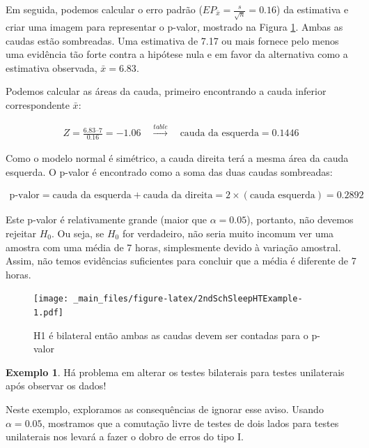 \documentclass[
]{book}
\theoremstyle{definition}
\theoremstyle{definition}
\newtheorem{example}{Exemplo}[chapter]
\theoremstyle{definition}
\theoremstyle{definition}
\theoremstyle{remark}
\begin{document}
Em seguida, podemos calcular o erro padrão (\(EP_{\bar{x}} = \frac{s}{\sqrt{n}} = 0.16\)) da estimativa e criar uma imagem para representar o p-valor, mostrado na Figura \ref{fig:2ndSchSleepHTExample}. Ambas as caudas estão sombreadas. Uma estimativa de 7.17 ou mais fornece pelo menos uma evidência tão forte contra a hipótese nula e em favor da alternativa como a estimativa observada, \(\bar{x} = 6.83\).

Podemos calcular as áreas da cauda, primeiro encontrando a cauda inferior correspondente \(\bar{x}\):

\begin{eqnarray*}
Z = \frac{6.83 – 7}{0.16} = -1.06 \quad\stackrel{table}{\rightarrow}\quad \text{cauda da esquerda} = 0.1446
\end{eqnarray*}

Como o modelo normal é simétrico, a cauda direita terá a mesma área da cauda esquerda. O p-valor é encontrado como a soma das duas caudas sombreadas:

\begin{eqnarray*}
\text{p-valor} = \text{cauda da esquerda} + \text{cauda da direita} = 2\times(\text{cauda esquerda}) = 0.2892
\end{eqnarray*}

Este p-valor é relativamente grande (maior que \(\alpha = 0.05\)), portanto, não devemos rejeitar \(H_0\). Ou seja, se \(H_0\) for verdadeiro, não seria muito incomum ver uma amostra com uma média de 7 horas, simplesmente devido à variação amostral. Assim, não temos evidências suficientes para concluir que a média é diferente de 7 horas.

\begin{figure}
\centering
\texttt{[image: \_main\_files/figure-latex/2ndSchSleepHTExample-1.pdf]}
\caption{\label{fig:2ndSchSleepHTExample}H1 é bilateral então ambas as caudas devem ser contadas para o p-valor}
\end{figure}

\begin{example}
\protect\hypertarget{exm:unnamed-chunk-173}{}{\label{exm:unnamed-chunk-173} }Há problema em alterar os testes bilaterais para testes unilaterais após observar os dados!

Neste exemplo, exploramos as consequências de ignorar esse aviso. Usando \(\alpha = 0.05\), mostramos que a comutação livre de testes de dois lados para testes unilaterais nos levará a fazer o dobro de erros do tipo I.
\end{example}
\end{document}
